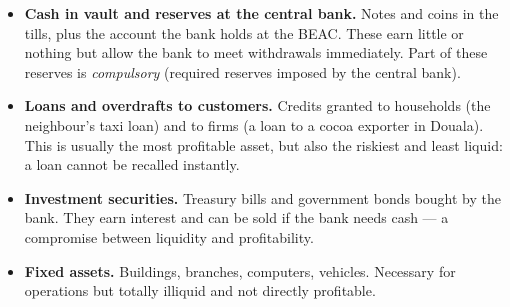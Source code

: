 \documentclass[11pt]{article}
\begin{document}
\begin{itemize}
\item \textbf{Cash in vault and reserves at the central bank.} Notes and coins in the tills, plus the account the bank holds at the BEAC. These earn little or nothing but allow the bank to meet withdrawals immediately. Part of these reserves is \emph{compulsory} (required reserves imposed by the central bank).
\item \textbf{Loans and overdrafts to customers.} Credits granted to households (the neighbour's taxi loan) and to firms (a loan to a cocoa exporter in Douala). This is usually the most profitable asset, but also the riskiest and least liquid: a loan cannot be recalled instantly.
\item \textbf{Investment securities.} Treasury bills and government bonds bought by the bank. They earn interest and can be sold if the bank needs cash — a compromise between liquidity and profitability.
\item \textbf{Fixed assets.} Buildings, branches, computers, vehicles. Necessary for operations but totally illiquid and not directly profitable.
\end{itemize}
\end{document}
